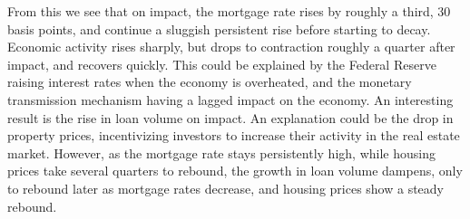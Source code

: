 \documentclass[12pt,a4paper]{article}
\begin{document}
From this we see that on impact, the mortgage rate rises by roughly a third, 30 basis points, and continue a sluggish persistent rise before starting to decay. Economic activity rises sharply, but drops to contraction roughly a quarter after impact, and recovers quickly. This could be explained by the Federal Reserve raising interest rates when the economy is overheated, and the monetary transmission mechanism having a lagged impact on the economy. An interesting result is the rise in loan volume on impact. An explanation could be the drop in property prices, incentivizing investors to increase their activity in the real estate market. However, as the mortgage rate stays persistently high, while housing prices take several quarters to rebound, the growth in loan volume dampens, only to rebound later as mortgage rates decrease, and housing prices show a steady rebound.\\
\end{document}
